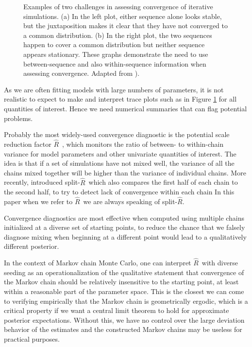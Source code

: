\documentclass[american,]{article}
\newcommand{\Rhat}{$\widehat{R}$}
\newcommand{\sRhat}{split-$\widehat{R}$}
\theoremstyle{definition}
\begin{document}
\begin{figure}
\begin{subfigure}[b]{0.37\textwidth}
\end{subfigure}
\caption{Examples of two challenges in assessing convergence of iterative
simulations. (a) In the left plot, either sequence alone looks stable, but the
juxtaposition makes it clear that they have not converged to a common
distribution. (b) In the right plot, the two sequences happen to cover a common
distribution but neither sequence appears stationary. These graphs demonstrate
the need to use between-sequence and also within-sequence information when
assessing convergence. Adapted from \citet{BDA3}).}
\label{converge.challenge}
\end{figure}

As we are often fitting models with large
numbers of parameters, it is not realistic to expect to make and interpret
trace plots such as in Figure \ref{converge.challenge} for all
quantities of interest. Hence we need numerical summaries that can flag
potential problems. 

Probably the most widely-used  
convergence diagnostic  is the potential scale reduction factor \Rhat\
\citep{Gelman+Rubin:1992, Brooks+Gelman:1998}, which monitors the ratio of between- to within-chain variance for model parameters and other univariate quantities of interest. The idea is that if a set of simulations have not mixed well, the variance of all the chains mixed together will be higher than the variance of individual chains.
More recently, \cite{BDA3} introduced \sRhat\ which also compares 
the first half of each chain to the second
half, to try to detect lack of convergence within each chain  In this
paper when we refer to \Rhat\ we are always speaking of \sRhat .

Convergence diagnostics are most effective when computed using multiple chains initialized at a 
diverse set of starting points, to reduce the chance that we falsely diagnose
mixing when beginning at a different point would lead to a 
qualitatively different posterior.

In the context of Markov chain Monte Carlo, one can interpret \Rhat\ 
with diverse seeding as an operationalization of the qualitative statement 
that convergence of the Markov chain should be relatively insensitive to the starting 
point, at least within a 
reasonable part of the parameter space. This is the closest we can come to 
verifying empirically that the Markov chain is geometrically ergodic, which is a critical 
property if we want  a central limit theorem to hold for approximate
posterior expectations. Without this, we have no control over the large
deviation behavior of the estimates and the constructed Markov chains may
be useless for practical purposes.
\end{document}
